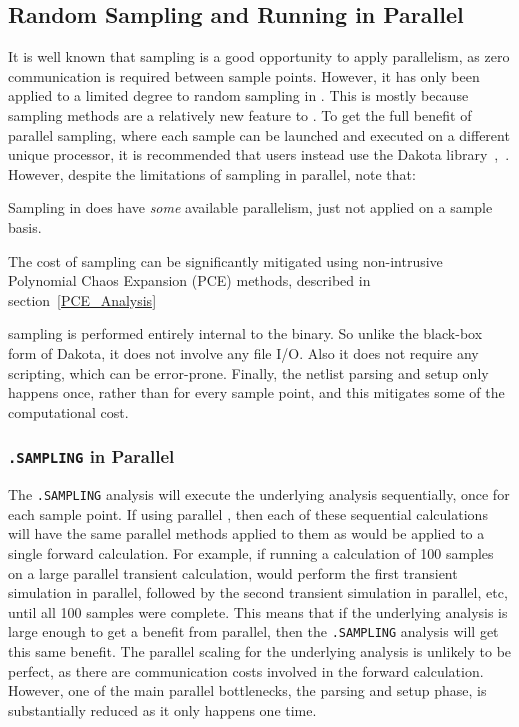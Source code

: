 \subsection{Random Sampling and Running in Parallel}

It is well known that sampling is a good opportunity to apply parallelism, as zero communication is required between sample points.
However, it has only been applied to a limited degree to random sampling in \Xyce{}.  
This is mostly because sampling methods 
are a relatively new feature to \Xyce{}. To get the full benefit of parallel sampling, where each 
sample can be launched and executed on a different unique processor, it is
recommended that \Xyce{} users instead use the Dakota library~\cite{DakotaTheoMan},~\cite{DakotaUsersMan}.
However, despite the limitations of \Xyce{} sampling in parallel, note that:
\begin{XyceItemize}
\item Sampling in \Xyce{} does have \emph{some} available parallelism, just not applied on a sample basis.
\item The cost of sampling can be significantly mitigated using non-intrusive Polynomial Chaos 
  Expansion (PCE) methods, described in section~\ref{PCE_Analysis}
\item \Xyce{} sampling is performed entirely internal to the \Xyce{} binary.  So unlike the black-box form of Dakota, it does not involve any file I/O. Also it does not require any scripting, which can be error-prone.    Finally, the netlist parsing and setup only happens once, rather than for every sample point, and this mitigates some of the computational cost.
\end{XyceItemize}

\subsubsection{\texttt{.SAMPLING} in Parallel}
The \texttt{.SAMPLING} analysis will execute the underlying analysis sequentially, once 
for each sample point.    If using parallel \Xyce{}, then each of these sequential 
calculations will have the same parallel methods applied to them as would be 
applied to a single forward calculation.    For example, if running a calculation
of 100 samples on a large parallel transient calculation, \Xyce{} would perform 
the first transient simulation in parallel, followed by the second transient 
simulation in parallel, etc, until all 100 samples were complete.
This means that if the underlying analysis is 
large enough to get a benefit from parallel, then the \texttt{.SAMPLING} 
analysis will get this same benefit.  The parallel scaling for the underlying 
analysis is unlikely to be perfect, as there are communication costs involved 
in the forward calculation.  However, one of the main parallel bottlenecks, 
the parsing and setup phase, is substantially reduced as it only happens one time.

